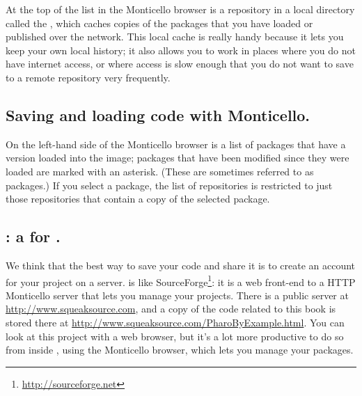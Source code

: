 \documentclass[a4paper,10pt,twoside]{book}
\begin{document}
At the top of the list in the Monticello browser is a repository in a local directory called the , which caches copies of the packages that you have loaded or published over the network. This local cache is really handy because it lets you keep your own local history; it also allows you to work in places where you do not have internet access, or where access is slow enough that you do not want to save to a remote repository very frequently.


\subsection{Saving and loading code with Monticello.}
On the left-hand side of the Monticello browser is a list of packages that have a version loaded into the image; packages that have been modified since they were loaded are marked with an asterisk.  (These are sometimes referred to as  packages.)  If you select a package, the list of repositories is restricted to just those repositories that contain a copy of the selected package.



\subsection{\ind{\sqsrc}: a  for \pharo.} 
We think that the best way to save your code and share it is to create an account for your project on a \sqsrc server. 
\sqsrc is like SourceForge\footnote{\url{http://sourceforge.net}}: it is a web front-end to a HTTP Monticello server that lets you manage your projects.
There is a public \sqsrc server at \url{http://www.squeaksource.com}, and a copy of the code related to this book is stored there at \url{http://www.squeaksource.com/PharoByExample.html}. You can look at this project with a web browser, but it's a lot more productive to do so from inside \pharo, using the Monticello browser, which lets you manage your packages.
\end{document}
